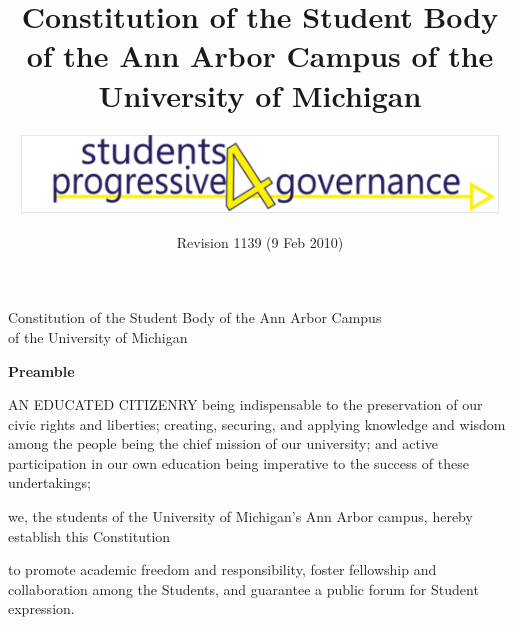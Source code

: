 \documentclass{constitution}
\begin{document}
	\renewcommand{\thepage}{\roman{page}}
	\title{Constitution of the Student Body of the Ann Arbor Campus of the University of Michigan}
	\author{\includegraphics[width=5in]{S4PGlogo}}
	\date{Revision 1139 (9 Feb 2010)}
	\maketitle
	\tableofcontents
	\newpage

	\renewcommand{\thepage}{\arabic{page}}
	\setcounter{page}{1}
	\pagestyle{fancy}
	\headheight 35pt
	\linenumbers
	
	\begin{center}
		\Large Constitution of the Student Body of the Ann Arbor Campus\\ of the University of Michigan
	\end{center}
	
	\begin{center}
		\bfseries Preamble
	\end{center}

	AN EDUCATED CITIZENRY being indispensable to the preservation of our civic rights and liberties; creating, securing, and applying knowledge and wisdom among the people being the chief mission of our university; and active participation in our own education being imperative to the success of these undertakings;

	    we, the students of the University of Michigan's Ann Arbor campus, hereby establish this Constitution

	to promote academic freedom and responsibility, foster fellowship and collaboration among the Students, and guarantee a public forum for Student expression.
	

	

	
	
	
	
	
	
	
	
	
	

	
	
	
\end{document}
